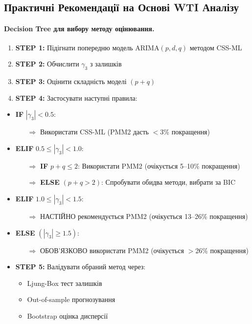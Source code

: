 \documentclass[12pt,a4paper]{article}
\begin{document}
\subsection{Практичні Рекомендації на Основі WTI Аналізу}
\label{subsec:wti_practical_recommendations}

\paragraph{Decision Tree для вибору методу оцінювання.}

\begin{enumerate}
    \item \textbf{STEP 1:} Підігнати попередню модель ARIMA$(p,d,q)$ методом CSS-ML
    \item \textbf{STEP 2:} Обчислити $\gamma_3$ з залишків
    \item \textbf{STEP 3:} Оцінити складність моделі $(p+q)$
    \item \textbf{STEP 4:} Застосувати наступні правила:
\end{enumerate}

\begin{itemize}
    \item \textbf{IF} $|\gamma_3| < 0.5$:
    \begin{itemize}
        \item[$\Rightarrow$] Використати CSS-ML (PMM2 дасть $<$3\% покращення)
    \end{itemize}

    \item \textbf{ELIF} $0.5 \leq |\gamma_3| < 1.0$:
    \begin{itemize}
        \item[$\Rightarrow$] \textbf{IF} $p+q \leq 2$: Використати PMM2 (очікується 5--10\% покращення)
        \item[$\Rightarrow$] \textbf{ELSE} $(p+q > 2)$: Спробувати обидва методи, вибрати за BIC
    \end{itemize}

    \item \textbf{ELIF} $1.0 \leq |\gamma_3| < 1.5$:
    \begin{itemize}
        \item[$\Rightarrow$] НАСТІЙНО рекомендується PMM2 (очікується 13--26\% покращення)
    \end{itemize}

    \item \textbf{ELSE} $(|\gamma_3| \geq 1.5)$:
    \begin{itemize}
        \item[$\Rightarrow$] ОБОВ'ЯЗКОВО використати PMM2 (очікується $>$26\% покращення)
    \end{itemize}

    \item \textbf{STEP 5:} Валідувати обраний метод через:
    \begin{itemize}
        \item Ljung-Box тест залишків
        \item Out-of-sample прогнозування
        \item Bootstrap оцінка дисперсії
    \end{itemize}
\end{itemize}
\end{document}
